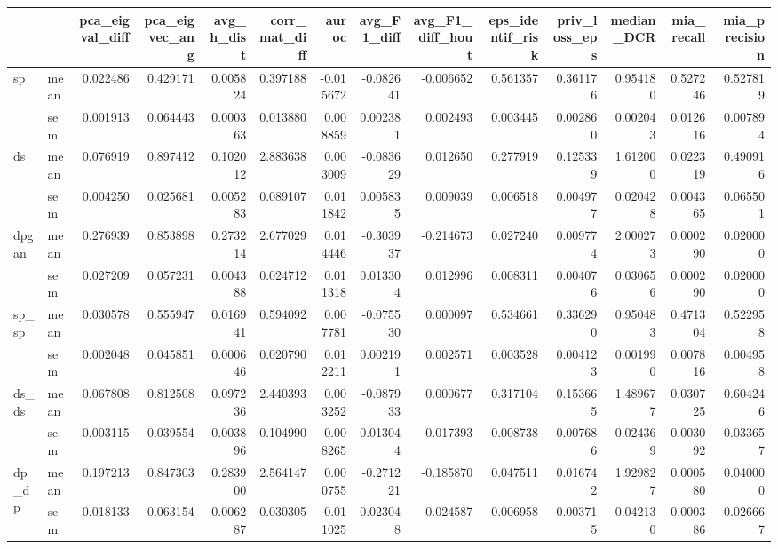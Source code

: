 \begin{tabular}{llrrrrrrrrrrrr}
\toprule
 &  & pca_eigval_diff & pca_eigvec_ang & avg_h_dist & corr_mat_diff & auroc & avg_F1_diff & avg_F1_diff_hout & eps_identif_risk & priv_loss_eps & median_DCR & mia_recall & mia_precision \\
\midrule
\multirow[t]{2}{*}{sp} & mean & 0.022486 & 0.429171 & 0.005824 & 0.397188 & -0.015672 & -0.082641 & -0.006652 & 0.561357 & 0.361176 & 0.954180 & 0.527246 & 0.527819 \\
 & sem & 0.001913 & 0.064443 & 0.000363 & 0.013880 & 0.008859 & 0.002381 & 0.002493 & 0.003445 & 0.002860 & 0.002043 & 0.012616 & 0.007894 \\
\cline{1-14}
\multirow[t]{2}{*}{ds} & mean & 0.076919 & 0.897412 & 0.102012 & 2.883638 & 0.003009 & -0.083629 & 0.012650 & 0.277919 & 0.125339 & 1.612000 & 0.022319 & 0.490916 \\
 & sem & 0.004250 & 0.025681 & 0.005283 & 0.089107 & 0.011842 & 0.005835 & 0.009039 & 0.006518 & 0.004977 & 0.020428 & 0.004365 & 0.065501 \\
\cline{1-14}
\multirow[t]{2}{*}{dpgan} & mean & 0.276939 & 0.853898 & 0.273214 & 2.677029 & 0.014446 & -0.303937 & -0.214673 & 0.027240 & 0.009774 & 2.000273 & 0.000290 & 0.020000 \\
 & sem & 0.027209 & 0.057231 & 0.004388 & 0.024712 & 0.011318 & 0.013304 & 0.012996 & 0.008311 & 0.004076 & 0.030656 & 0.000290 & 0.020000 \\
\cline{1-14}
\multirow[t]{2}{*}{sp_sp} & mean & 0.030578 & 0.555947 & 0.016941 & 0.594092 & 0.007781 & -0.075530 & 0.000097 & 0.534661 & 0.336290 & 0.950483 & 0.471304 & 0.522958 \\
 & sem & 0.002048 & 0.045851 & 0.000646 & 0.020790 & 0.012211 & 0.002191 & 0.002571 & 0.003528 & 0.004123 & 0.001990 & 0.007816 & 0.004958 \\
\cline{1-14}
\multirow[t]{2}{*}{ds_ds} & mean & 0.067808 & 0.812508 & 0.097236 & 2.440393 & 0.003252 & -0.087933 & 0.000677 & 0.317104 & 0.153665 & 1.489677 & 0.030725 & 0.604246 \\
 & sem & 0.003115 & 0.039554 & 0.003896 & 0.104990 & 0.008265 & 0.013044 & 0.017393 & 0.008738 & 0.007686 & 0.024369 & 0.003092 & 0.033657 \\
\cline{1-14}
\multirow[t]{2}{*}{dp_dp} & mean & 0.197213 & 0.847303 & 0.283900 & 2.564147 & 0.000755 & -0.271221 & -0.185870 & 0.047511 & 0.016742 & 1.929827 & 0.000580 & 0.040000 \\
 & sem & 0.018133 & 0.063154 & 0.006287 & 0.030305 & 0.011025 & 0.023048 & 0.024587 & 0.006958 & 0.003715 & 0.042130 & 0.000386 & 0.026667 \\

\end{tabular}
